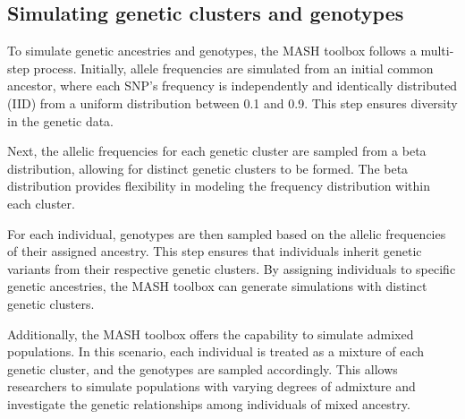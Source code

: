 \documentclass[sn-nature]{sn-jnl}%
\begin{document}
\subsection{Simulating genetic clusters and genotypes}
To simulate genetic ancestries and genotypes, the MASH toolbox follows a multi-step process. Initially, allele frequencies are simulated from an initial common ancestor, where each SNP's frequency is independently and identically distributed (IID) from a uniform distribution between 0.1 and 0.9. This step ensures diversity in the genetic data.

Next, the allelic frequencies for each genetic cluster are sampled from a beta distribution, allowing for distinct genetic clusters to be formed. The beta distribution provides flexibility in modeling the frequency distribution within each cluster.

For each individual, genotypes are then sampled based on the allelic frequencies of their assigned ancestry. This step ensures that individuals inherit genetic variants from their respective genetic clusters. By assigning individuals to specific genetic ancestries, the MASH toolbox can generate simulations with distinct genetic clusters.

Additionally, the MASH toolbox offers the capability to simulate admixed populations. In this scenario, each individual is treated as a mixture of each genetic cluster, and the genotypes are sampled accordingly. This allows researchers to simulate populations with varying degrees of admixture and investigate the genetic relationships among individuals of mixed ancestry.
\end{document}
